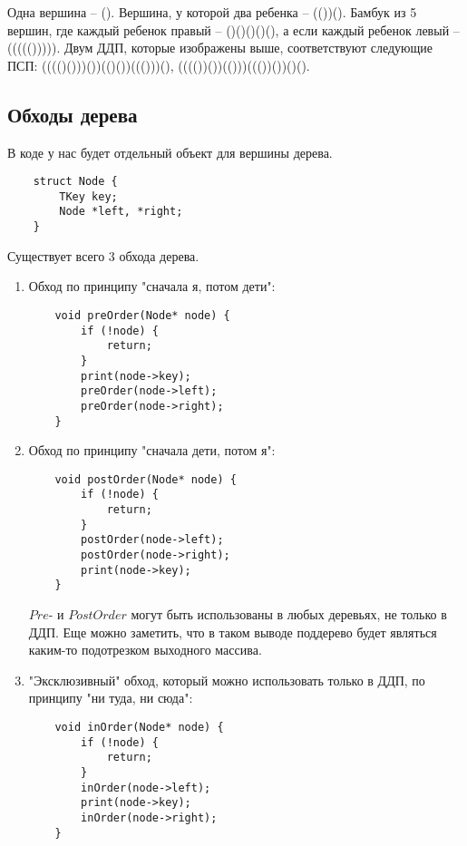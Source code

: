 \begin{example}
    Одна вершина -- (). Вершина, у которой два ребенка -- (())(). Бамбук из 5 вершин, где каждый ребенок правый -- ()()()()(), а если каждый ребенок левый -- ((((())))).
    Двум ДДП, которые изображены выше, соответствуют следующие ПСП: (((()()))())(()())((()))(), (((())())(()))((())())()().
\end{example}



\subsection{Обходы дерева}



В коде у нас будет отдельный объект для вершины дерева.
\begin{lstlisting}
    struct Node {
        TKey key;
        Node *left, *right;
    }
\end{lstlisting}

Существует всего 3 обхода дерева. 

\begin{enumerate}
    \item Обход по принципу "сначала я, потом дети":
    \begin{lstlisting}
    void preOrder(Node* node) {
        if (!node) {
            return;
        }
        print(node->key);
        preOrder(node->left);
        preOrder(node->right);
    }
    \end{lstlisting}
    \item Обход по принципу "сначала дети, потом я":
    \begin{lstlisting}
    void postOrder(Node* node) {
        if (!node) {
            return;
        }
        postOrder(node->left);
        postOrder(node->right);
        print(node->key);
    }
    \end{lstlisting}
    $Pre$- и $PostOrder$ могут быть использованы в любых деревьях, не только в ДДП. Еще можно заметить, что в таком выводе поддерево будет являться каким-то подотрезком выходного массива.
    \item "Эксклюзивный" обход, который можно использовать только в ДДП, по принципу "ни туда, ни сюда":
    \begin{lstlisting}
    void inOrder(Node* node) {
        if (!node) {
            return;
        }
        inOrder(node->left);
        print(node->key);
        inOrder(node->right);
    }
    \end{lstlisting}
\end{enumerate}

